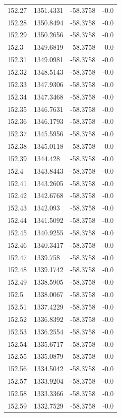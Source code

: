 \begin{table}[H]
\begin{tabular}{llll}
152.27 & 1351.4331 & -58.3758 & -0.0 \\
152.28 & 1350.8494 & -58.3758 & -0.0 \\
152.29 & 1350.2656 & -58.3758 & -0.0 \\
152.3 & 1349.6819 & -58.3758 & -0.0 \\
152.31 & 1349.0981 & -58.3758 & -0.0 \\
152.32 & 1348.5143 & -58.3758 & -0.0 \\
152.33 & 1347.9306 & -58.3758 & -0.0 \\
152.34 & 1347.3468 & -58.3758 & -0.0 \\
152.35 & 1346.7631 & -58.3758 & -0.0 \\
152.36 & 1346.1793 & -58.3758 & -0.0 \\
152.37 & 1345.5956 & -58.3758 & -0.0 \\
152.38 & 1345.0118 & -58.3758 & -0.0 \\
152.39 & 1344.428 & -58.3758 & -0.0 \\
152.4 & 1343.8443 & -58.3758 & -0.0 \\
152.41 & 1343.2605 & -58.3758 & -0.0 \\
152.42 & 1342.6768 & -58.3758 & -0.0 \\
152.43 & 1342.093 & -58.3758 & -0.0 \\
152.44 & 1341.5092 & -58.3758 & -0.0 \\
152.45 & 1340.9255 & -58.3758 & -0.0 \\
152.46 & 1340.3417 & -58.3758 & -0.0 \\
152.47 & 1339.758 & -58.3758 & -0.0 \\
152.48 & 1339.1742 & -58.3758 & -0.0 \\
152.49 & 1338.5905 & -58.3758 & -0.0 \\
152.5 & 1338.0067 & -58.3758 & -0.0 \\
152.51 & 1337.4229 & -58.3758 & -0.0 \\
152.52 & 1336.8392 & -58.3758 & -0.0 \\
152.53 & 1336.2554 & -58.3758 & -0.0 \\
152.54 & 1335.6717 & -58.3758 & -0.0 \\
152.55 & 1335.0879 & -58.3758 & -0.0 \\
152.56 & 1334.5042 & -58.3758 & -0.0 \\
152.57 & 1333.9204 & -58.3758 & -0.0 \\
152.58 & 1333.3366 & -58.3758 & -0.0 \\
152.59 & 1332.7529 & -58.3758 & -0.0 \\

\end{tabular}
\end{table}
